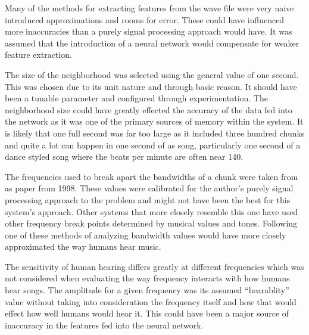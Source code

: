 Many of the methods for extracting features from the wave file were very naive introduced approximations and rooms for error. These could have influenced more inaccuracies than a purely signal processing approach would have. It was assumed that the introduction of a neural network would compensate for weaker feature extraction.

The size of the neighborhood was selected using the general value of one second. This was chosen due to its unit nature and through basic reason. It should have been a tunable parameter and configured through experimentation. The neighborhood size could have greatly effected the accuracy of the data fed into the network as it was one of the primary sources of memory within the system. It is likely that one full second was far too large as it included three hundred chunks and quite a lot can happen in one second of as song, particularly one second of a dance styled song where the beats per minute are often near 140.

The frequencies used to break apart the bandwidths of a chunk were taken from as paper from 1998. These values were calibrated for the author's purely signal processing approach to the problem and might not have been the best for this system's approach. Other systems that more closely resemble this one have used other frequency break points determined by musical values and tones. Following one of these methods of analyzing bandwidth values would have more closely approximated the way humans hear music.

The sensitivity of human hearing differs greatly at different frequencies which was not considered when evaluating the way frequency interacts with how humans hear songs. The amplitude for a given frequency was its assumed ``hearablity'' value without taking into consideration the frequency itself and how that would effect how well humans would hear it. This could have been a major source of inaccuracy in the features fed into the neural network.
